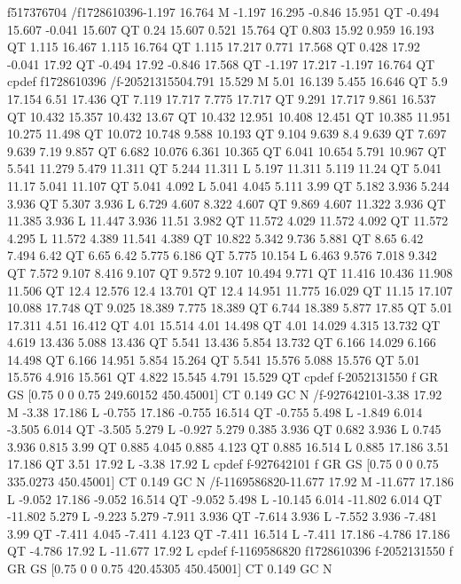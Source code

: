 f517376704
/f1728610396{-1.197 16.764 M
-1.197 16.295 -0.846 15.951 QT
-0.494 15.607 -0.041 15.607 QT
0.24 15.607 0.521 15.764 QT
0.803 15.92 0.959 16.193 QT
1.115 16.467 1.115 16.764 QT
1.115 17.217 0.771 17.568 QT
0.428 17.92 -0.041 17.92 QT
-0.494 17.92 -0.846 17.568 QT
-1.197 17.217 -1.197 16.764 QT
cp}def
f1728610396
/f-2052131550{4.791 15.529 M
5.01 16.139 5.455 16.646 QT
5.9 17.154 6.51 17.436 QT
7.119 17.717 7.775 17.717 QT
9.291 17.717 9.861 16.537 QT
10.432 15.357 10.432 13.67 QT
10.432 12.951 10.408 12.451 QT
10.385 11.951 10.275 11.498 QT
10.072 10.748 9.588 10.193 QT
9.104 9.639 8.4 9.639 QT
7.697 9.639 7.19 9.857 QT
6.682 10.076 6.361 10.365 QT
6.041 10.654 5.791 10.967 QT
5.541 11.279 5.479 11.311 QT
5.244 11.311 L
5.197 11.311 5.119 11.24 QT
5.041 11.17 5.041 11.107 QT
5.041 4.092 L
5.041 4.045 5.111 3.99 QT
5.182 3.936 5.244 3.936 QT
5.307 3.936 L
6.729 4.607 8.322 4.607 QT
9.869 4.607 11.322 3.936 QT
11.385 3.936 L
11.447 3.936 11.51 3.982 QT
11.572 4.029 11.572 4.092 QT
11.572 4.295 L
11.572 4.389 11.541 4.389 QT
10.822 5.342 9.736 5.881 QT
8.65 6.42 7.494 6.42 QT
6.65 6.42 5.775 6.186 QT
5.775 10.154 L
6.463 9.576 7.018 9.342 QT
7.572 9.107 8.416 9.107 QT
9.572 9.107 10.494 9.771 QT
11.416 10.436 11.908 11.506 QT
12.4 12.576 12.4 13.701 QT
12.4 14.951 11.775 16.029 QT
11.15 17.107 10.088 17.748 QT
9.025 18.389 7.775 18.389 QT
6.744 18.389 5.877 17.85 QT
5.01 17.311 4.51 16.412 QT
4.01 15.514 4.01 14.498 QT
4.01 14.029 4.315 13.732 QT
4.619 13.436 5.088 13.436 QT
5.541 13.436 5.854 13.732 QT
6.166 14.029 6.166 14.498 QT
6.166 14.951 5.854 15.264 QT
5.541 15.576 5.088 15.576 QT
5.01 15.576 4.916 15.561 QT
4.822 15.545 4.791 15.529 QT
cp}def
f-2052131550
f
GR
GS
[0.75 0 0 0.75 249.60152 450.45001] CT
0.149 GC
N
/f-927642101{-3.38 17.92 M
-3.38 17.186 L
-0.755 17.186 -0.755 16.514 QT
-0.755 5.498 L
-1.849 6.014 -3.505 6.014 QT
-3.505 5.279 L
-0.927 5.279 0.385 3.936 QT
0.682 3.936 L
0.745 3.936 0.815 3.99 QT
0.885 4.045 0.885 4.123 QT
0.885 16.514 L
0.885 17.186 3.51 17.186 QT
3.51 17.92 L
-3.38 17.92 L
cp}def
f-927642101
f
GR
GS
[0.75 0 0 0.75 335.0273 450.45001] CT
0.149 GC
N
/f-1169586820{-11.677 17.92 M
-11.677 17.186 L
-9.052 17.186 -9.052 16.514 QT
-9.052 5.498 L
-10.145 6.014 -11.802 6.014 QT
-11.802 5.279 L
-9.223 5.279 -7.911 3.936 QT
-7.614 3.936 L
-7.552 3.936 -7.481 3.99 QT
-7.411 4.045 -7.411 4.123 QT
-7.411 16.514 L
-7.411 17.186 -4.786 17.186 QT
-4.786 17.92 L
-11.677 17.92 L
cp}def
f-1169586820
f1728610396
f-2052131550
f
GR
GS
[0.75 0 0 0.75 420.45305 450.45001] CT
0.149 GC
N

